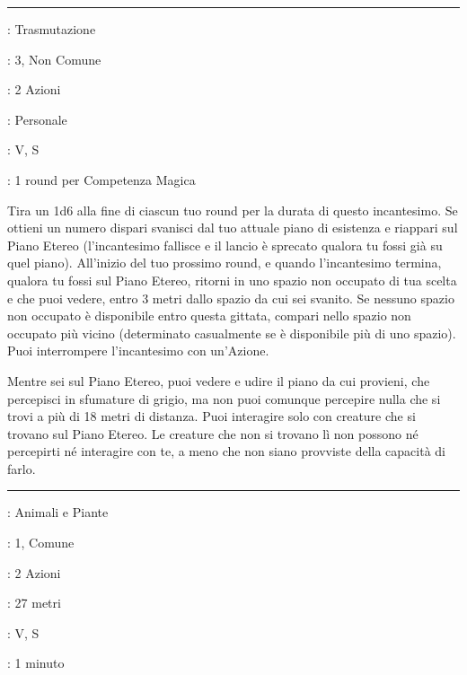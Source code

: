 \begin{multicols}{2}
\smallskip\noindent\rule{\linewidth}{2pt} \hypertarget{Intermittenza}{}\medskip{}
\noindent
\begin{description}[noitemsep, topsep=0pt, parsep=0pt, partopsep=0pt, leftmargin=0cm, labelwidth=2.8cm]
	\item[\textbf{Lista di Magia}]: Trasmutazione
	\item[\textbf{Livello}]: 3, Non Comune
	\item[\textbf{T. di Lancio}]: 2 Azioni
	\item[\textbf{Gittata}]: Personale
	\item[\textbf{Componenti}]: V, S
	\item[\textbf{Durata}]: 1 round per Competenza Magica
\end{description}

Tira un 1d6 alla fine di ciascun tuo round per la durata di questo incantesimo. Se ottieni un numero dispari svanisci dal tuo attuale piano di esistenza e riappari sul Piano Etereo (l'incantesimo fallisce e il lancio è sprecato qualora tu fossi già su quel piano). All'inizio del tuo prossimo round, e quando l'incantesimo termina, qualora tu fossi sul Piano Etereo, ritorni in uno spazio non occupato di tua scelta e che puoi vedere, entro 3 metri dallo spazio da cui sei svanito. Se nessuno spazio non occupato è disponibile entro questa gittata, compari nello spazio non occupato più vicino (determinato casualmente se è disponibile più di uno spazio). Puoi interrompere l'incantesimo con un'Azione.

Mentre sei sul Piano Etereo, puoi vedere e udire il piano da cui provieni, che percepisci in sfumature di grigio, ma non puoi comunque percepire nulla che si trovi a più di 18 metri di distanza. Puoi interagire solo con creature che si trovano sul Piano Etereo. Le creature che non si trovano lì non possono né percepirti né interagire con te, a meno che non siano provviste della capacità di farlo.

\smallskip\noindent\rule{\linewidth}{2pt} \hypertarget{Intralciare}{}\medskip{}
\noindent
\begin{description}[noitemsep, topsep=0pt, parsep=0pt, partopsep=0pt, leftmargin=0cm, labelwidth=2.8cm]
	\item[\textbf{Lista di Magia}]: Animali e Piante
	\item[\textbf{Livello}]: 1, Comune
	\item[\textbf{T. di Lancio}]: 2 Azioni
	\item[\textbf{Gittata}]: 27 metri
	\item[\textbf{Componenti}]: V, S
	\item[\textbf{Durata}]: 1 minuto
\end{description}


\end{multicols}

